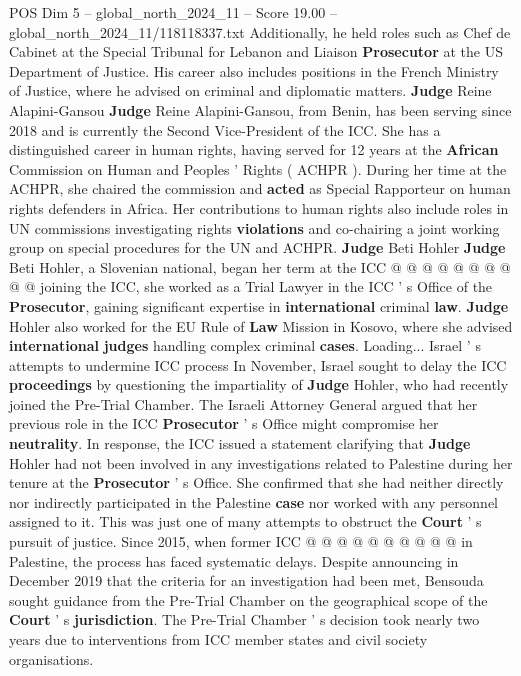 \begin{textsample}{POS Dim 5 – global\_north\_2024\_11 – Score 19.00 – global\_north\_2024\_11/118118337.txt}
Additionally, he held roles such as Chef de Cabinet at the Special Tribunal for Lebanon and Liaison \textbf{Prosecutor} at the US Department of Justice.
His career also includes positions in the French Ministry of Justice, where he advised on criminal and diplomatic matters. \textbf{Judge} Reine Alapini-Gansou \textbf{Judge} Reine Alapini-Gansou, from Benin, has been serving since 2018 and is currently the Second Vice-President of the ICC.
She has a distinguished career in human rights, having served for 12 years at the \textbf{African} Commission on Human and Peoples ' Rights ( ACHPR ).
During her time at the ACHPR, she chaired the commission and \textbf{acted} as Special Rapporteur on human rights defenders in Africa.
Her contributions to human rights also include roles in UN commissions investigating rights \textbf{violations} and co-chairing a joint working group on special procedures for the UN and ACHPR. \textbf{Judge} Beti Hohler \textbf{Judge} Beti Hohler, a Slovenian national, began her term at the ICC @ @ @ @ @ @ @ @ @ @ joining the ICC, she worked as a Trial Lawyer in the ICC ' s Office of the \textbf{Prosecutor}, gaining significant expertise in \textbf{international} criminal \textbf{law}. \textbf{Judge} Hohler also worked for the EU Rule of \textbf{Law} Mission in Kosovo, where she advised \textbf{international} \textbf{judges} handling complex criminal \textbf{cases}.
Loading...
Israel ' s attempts to undermine ICC process In November, Israel sought to delay the ICC \textbf{proceedings} by questioning the impartiality of \textbf{Judge} Hohler, who had recently joined the Pre-Trial Chamber.
The Israeli Attorney General argued that her previous role in the ICC \textbf{Prosecutor} ' s Office might compromise her \textbf{neutrality}.
In response, the ICC issued a statement clarifying that \textbf{Judge} Hohler had not been involved in any investigations related to Palestine during her tenure at the \textbf{Prosecutor} ' s Office.
She confirmed that she had neither directly nor indirectly participated in the Palestine \textbf{case} nor worked with any personnel assigned to it.
This was just one of many attempts to obstruct the \textbf{Court} ' s pursuit of justice.
Since 2015, when former ICC @ @ @ @ @ @ @ @ @ @ in Palestine, the process has faced systematic delays.
Despite announcing in December 2019 that the criteria for an investigation had been met, Bensouda sought guidance from the Pre-Trial Chamber on the geographical scope of the \textbf{Court} ' s \textbf{jurisdiction}.
The Pre-Trial Chamber ' s decision took nearly two years due to interventions from ICC member states and civil society organisations.

\end{textsample}
